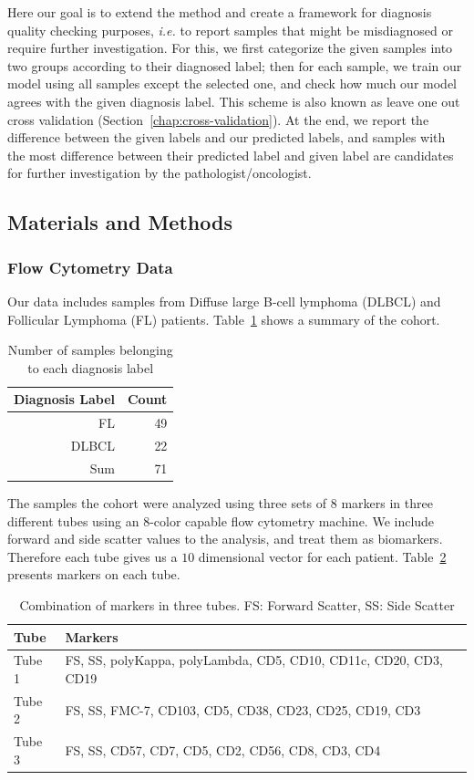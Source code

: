 Here our goal is to extend the method and create a framework for diagnosis quality checking purposes, \emph{i.e.} to report samples that might be misdiagnosed or require further investigation. For this, we first categorize the given samples into two groups according to their diagnosed label; then for each sample, we train our model using all samples except the selected one, and check how much our model agrees with the given diagnosis label. This scheme is also known as leave one out cross validation (Section~\ref{chap:cross-validation}). At the end, we report the difference between the given labels and our predicted labels, and samples with the most difference between their predicted label and given label are candidates for further investigation by the pathologist/oncologist.
\subsection{Materials and Methods}
\subsubsection{Flow Cytometry Data}
Our data includes samples from Diffuse large B-cell lymphoma (DLBCL) and Follicular Lymphoma (FL) patients. Table~\ref{tbl:fcs-qa-cohorts} shows a summary of the cohort.

\begin{table}[!ht]
  \centering
  \begin{tabular}{rr}
  	Diagnosis Label & Count \\ \hline
    FL & 49\\
    DLBCL & 22 \\ 
    Sum & 71
  \end{tabular}
  \caption{Number of samples belonging to each diagnosis label}
  \label{tbl:fcs-qa-cohorts}
\end{table}

The samples the cohort were analyzed using three sets of 8 markers in three different tubes using an 8-color capable flow cytometry machine. We include forward and side scatter values to the analysis, and treat them as biomarkers. Therefore each tube gives us a $10$ dimensional vector for each patient. Table~\ref{tbl:fcs-qa-markers} presents markers on each tube.

\begin{table}[!ht]
  \centering
  \begin{tabular}{lm{7cm}}
    Tube & Markers \\ \hline
    Tube 1 & FS, SS, polyKappa, polyLambda, CD5, CD10, CD11c, CD20, CD3, CD19 \\
    Tube 2 & FS, SS, FMC-7, CD103, CD5, CD38, CD23, CD25, CD19, CD3 \\
    Tube 3 & FS, SS, CD57, CD7, CD5, CD2, CD56, CD8, CD3, CD4 \\ \hline
  \end{tabular}
  \caption{Combination of markers in three tubes. FS: Forward Scatter, SS: Side Scatter}
  \label{tbl:fcs-qa-markers}
\end{table}


